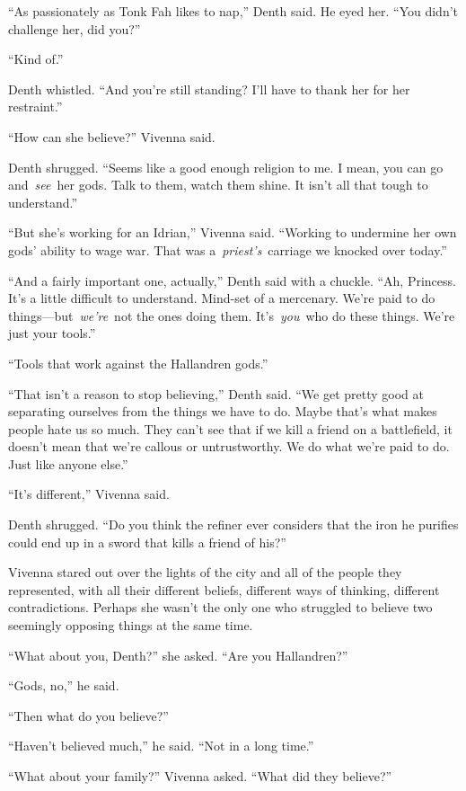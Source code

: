 “As passionately as Tonk Fah likes to nap,” Denth said. He eyed her. “You didn’t challenge her, did you?”

“Kind of.”

Denth whistled. “And you’re still standing? I’ll have to thank her for her restraint.”

“How can she believe?” Vivenna said.

Denth shrugged. “Seems like a good enough religion to me. I mean, you can go and~\textit{see}~her gods. Talk to them, watch them shine. It isn’t all that tough to understand.”

“But she’s working for an Idrian,” Vivenna said. “Working to undermine her own gods’ ability to wage war. That was a~\textit{priest’s}~carriage we knocked over today.”

“And a fairly important one, actually,” Denth said with a chuckle. “Ah, Princess. It’s a little difficult to understand. Mind-set of a mercenary. We’re paid to do things—but~\textit{we’re}~not the ones doing them. It’s~\textit{you}~who do these things. We’re just your tools.”

“Tools that work against the Hallandren gods.”

“That isn’t a reason to stop believing,” Denth said. “We get pretty good at separating ourselves from the things we have to do. Maybe that’s what makes people hate us so much. They can’t see that if we kill a friend on a battlefield, it doesn’t mean that we’re callous or untrustworthy. We do what we’re paid to do. Just like anyone else.”

“It’s different,” Vivenna said.

Denth shrugged. “Do you think the refiner ever considers that the iron he purifies could end up in a sword that kills a friend of his?”

Vivenna stared out over the lights of the city and all of the people they represented, with all their different beliefs, different ways of thinking, different contradictions. Perhaps she wasn’t the only one who struggled to believe two seemingly opposing things at the same time.

“What about you, Denth?” she asked. “Are you Hallandren?”

“Gods, no,” he said.

“Then what do you believe?”

“Haven’t believed much,” he said. “Not in a long time.”

“What about your family?” Vivenna asked. “What did they believe?”

